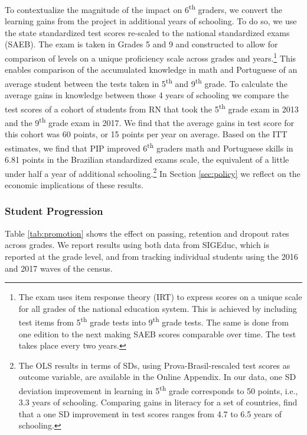 \documentclass[11pt,a4paper]{article}
\begin{document}
	To contextualize the magnitude of the impact on 6\textsuperscript{th} graders, we convert the learning gains from the project in additional years of schooling. To do so, we use the state standardized test scores re-scaled to the national standardized exams (SAEB). The exam is taken in Grades 5 and 9 and constructed to allow for comparison of levels on a unique proficiency scale across grades and years.\footnote{The exam uses item response theory (IRT) to express scores on a unique scale for all grades of the national education system. This is achieved by including test items from 5\textsuperscript{th} grade tests into 9\textsuperscript{th} grade tests. The same is done from one edition to the next making SAEB scores comparable over time. The test takes place every two years.} This enables comparison of the accumulated knowledge in math and Portuguese of an average student between the tests taken in 5\textsuperscript{th} and 9\textsuperscript{th} grade. To calculate the average gains in knowledge between those 4 years of schooling we compare the test scores of a cohort of students from RN that took the 5\textsuperscript{th} grade exam in 2013 and the 9\textsuperscript{th} grade exam in 2017. We find that the average gains in test score for this cohort was 60 points, or 15 points per year on average. Based on the ITT estimates, we find that PIP improved 6\textsuperscript{th} graders math and Portuguese skills in 6.81 points in the Brazilian standardized exams scale, the equivalent of a little under half a year of additional schooling.\footnote{The OLS results in terms of SDs, using Prova-Brasil-rescaled test scores as outcome variable, are available in the Online Appendix. In our data, one SD deviation improvement in learning in 5\textsuperscript{th} grade corresponds to 50 points, i.e., 3.3 years of schooling. Comparing gains in literacy for a set of countries, \citet{evans2019equivalent} find that a one SD improvement in test scores ranges from 4.7 to 6.5 years of schooling.} In Section \ref{sec:policy} we reflect on the economic implications of these results.
	
	
	\subsubsection*{Student Progression} \label{sec:flow}
	
	Table \ref{tab:promotion} shows the effect on passing, retention and dropout rates across grades. We report results using both data from SIGEduc, which is reported at the grade level, and from tracking individual students using the 2016 and 2017 waves of the census. 
	
\end{document}
